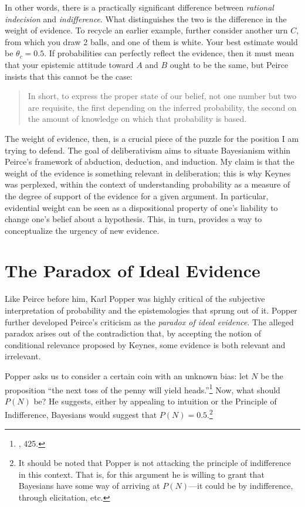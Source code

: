 In other words, there is a practically significant difference between
\emph{rational indecision} and \emph{indifference}. What distinguishes
the two is the difference in the weight of evidence. To recycle an earlier example, further consider another urn \(C\), from which you draw
2 balls, and one of them is white.  Your best estimate would be
\(\theta_c = 0.5\). If probabilities can perfectly reflect the evidence,
then it must mean that your epistemic attitude toward \(A\) and \(B\)
ought to be the same, but Peirce insists that this cannot be the case:

\begin{quote}
In short, to express the proper state of our belief, not one number but
two are requisite, the first depending on the inferred probability, the
second on the amount of knowledge on which that probability is based.
\end{quote}

The weight of evidence, then, is a crucial piece of the puzzle for the
position I am trying to defend. The goal of deliberativism
aims to situate Bayesianism within Peirce's framework of abduction,
deduction, and induction. My claim is that the weight of the evidence is something relevant in deliberation; this is why Keynes was perplexed, within the context of understanding probability as a measure of the degree of support of the evidence for a given argument. In particular, evidential weight can be seen as a dispositional property of one's liability to change one's belief about a hypothesis. This, in turn, provides a way to conceptualize the urgency of new evidence.

\hypertarget{the-paradox-of-ideal-evidence-1}{%
\section{The Paradox of Ideal
Evidence}\label{the-paradox-of-ideal-evidence-1}}

Like Peirce before him, Karl Popper was highly critical of the
subjective interpretation of probability and the epistemologies that
sprung out of it. Popper further developed Peirce's criticism as the
\emph{paradox of ideal evidence}. The alleged paradox arises out of the
contradiction that, by accepting the notion of conditional relevance
proposed by Keynes, some evidence is both relevant and irrelevant.

Popper asks us to consider a certain coin with an unknown bias: let
\(N\) be the proposition ``the next toss of the penny will yield
heads.''\footnote{\cite{popperlogic}, 425.}
Now, what should \(P(N)\) be? He suggests, either by appealing to
intuition or the Principle of Indifference, Bayesians would suggest that
\(P(N) = 0.5\).\footnote{It should be noted that Popper is not attacking
  the principle of indifference in this context. That is, for this
  argument he is willing to grant that Bayesians have some way of
  arriving at \(P(N)\)---it could be by indifference, through
  elicitation, etc.}

